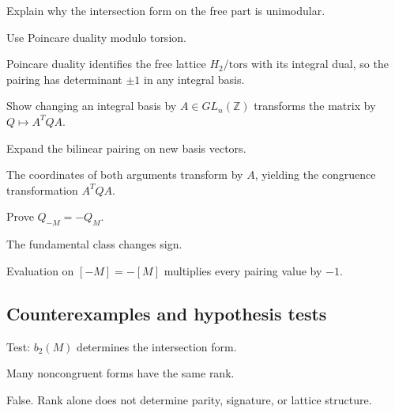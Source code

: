 \begin{exercise}[Unimodularity]\label{exr:viii34-ped-07}
Explain why the intersection form on the free part is unimodular.
\end{exercise}
\begin{hint}
Use Poincare duality modulo torsion.
\end{hint}
\begin{solution}
Poincare duality identifies the free lattice $H_2/\mathrm{tors}$ with its integral dual, so the pairing has determinant $\pm1$ in any integral basis.
\end{solution}

\begin{exercise}\label{exr:viii34-ped-08}
Show changing an integral basis by $A\in GL_n(\mathbb Z)$ transforms the matrix by $Q\mapsto A^TQA$.
\end{exercise}
\begin{hint}
Expand the bilinear pairing on new basis vectors.
\end{hint}
\begin{solution}
The coordinates of both arguments transform by $A$, yielding the congruence transformation $A^TQA$.
\end{solution}

\begin{exercise}\label{exr:viii34-ped-09}
Prove $Q_{-M}=-Q_M$.
\end{exercise}
\begin{hint}
The fundamental class changes sign.
\end{hint}
\begin{solution}
Evaluation on $[-M]=-[M]$ multiplies every pairing value by $-1$.
\end{solution}

\subsection*{Counterexamples and hypothesis tests}

\begin{exercise}\label{exr:viii34-ped-10}
Test: $b_2(M)$ determines the intersection form.
\end{exercise}
\begin{hint}
Many noncongruent forms have the same rank.
\end{hint}
\begin{solution}
False. Rank alone does not determine parity, signature, or lattice structure.
\end{solution}

